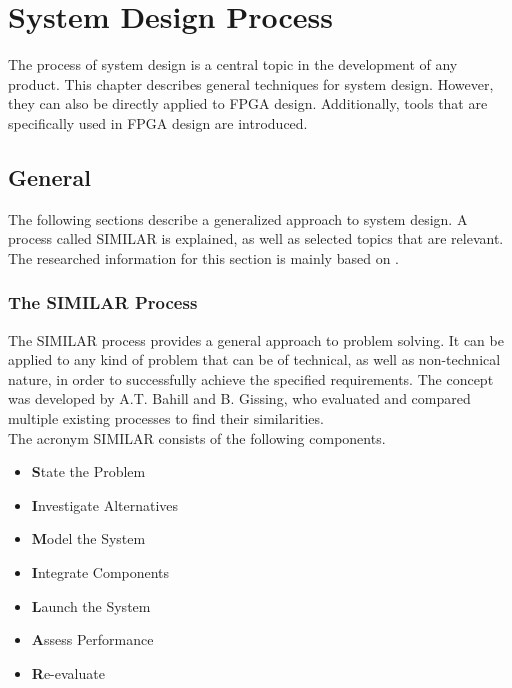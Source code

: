 \chapter{System Design Process}
\label{cha:SystemDesignProcess}

The process of system design is a central topic in the development of any product.
This chapter describes general techniques for system design.
However, they can also be directly applied to FPGA design.
Additionally, tools that are specifically used in FPGA design are introduced.

\section{General}

The following sections describe a generalized approach to system design.
A process called SIMILAR is explained, as well as selected topics that are relevant.
The researched information for this section is mainly based on \cite{BahillA.Terry2017TDiS}.

\subsection{The SIMILAR Process}

The SIMILAR process provides a general approach to problem solving.
It can be applied to any kind of problem that can be of technical, as well as non-technical nature, in order to successfully achieve the specified requirements.
The concept was developed by A.T. Bahill and B. Gissing, who evaluated and compared multiple existing processes to find their similarities.\\

The acronym SIMILAR consists of the following components.

\begin{itemize}
  \item \textbf{S}tate the Problem
  \item \textbf{I}nvestigate Alternatives
  \item \textbf{M}odel the System
  \item \textbf{I}ntegrate Components
  \item \textbf{L}aunch the System
  \item \textbf{A}ssess Performance
  \item \textbf{R}e-evaluate
\end{itemize}


